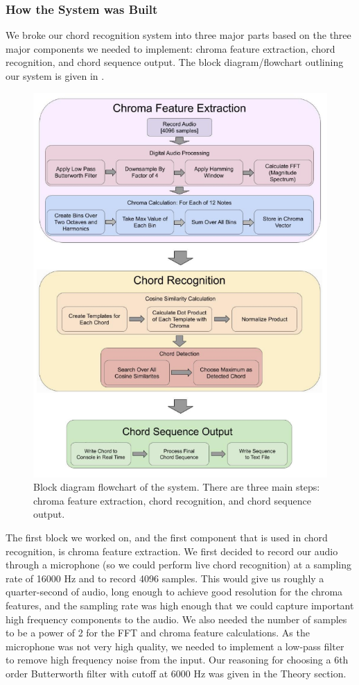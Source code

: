 \documentclass[journal]{IEEEtran}
\begin{document}
\subsubsection{How the System was Built}
We broke our chord recognition system into three major parts based on the three major components we needed to implement: chroma feature extraction, chord recognition, and chord sequence output.
The block diagram/flowchart outlining our system is given in .
\begin{figure}[!t]
    \centering
    \includegraphics[width = \linewidth]{../Figures/block_diagram_2}
    \caption{Block diagram flowchart of the system.
    There are three main steps: chroma feature extraction, chord recognition, and chord sequence output.}
    \label{fig:block}
\end{figure}

The first block we worked on, and the first component that is used in chord recognition, is chroma feature extraction.
We first decided to record our audio through a microphone (so we could perform live chord recognition) at a sampling rate of 16000 Hz and to record 4096 samples.
This would give us roughly a quarter-second of audio, long enough to achieve good resolution for the chroma features, and the sampling rate was high enough that we could capture important high frequency components to the audio.
We also needed the number of samples to be a power of 2 for the FFT and chroma feature calculations.
As the microphone was not very high quality, we needed to implement a low-pass filter to remove high frequency noise from the input.
Our reasoning for choosing a 6th order Butterworth filter with cutoff at 6000 Hz was given in the Theory section.
\end{document}
